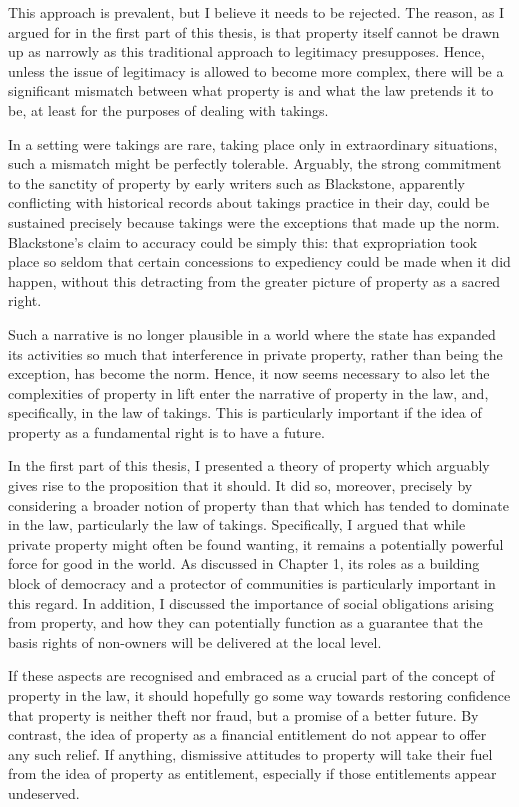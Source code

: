 This approach is prevalent, but I believe it needs to be rejected. The reason, as I argued for in the first part of this thesis, is that property itself cannot be drawn up as narrowly as this traditional approach to legitimacy presupposes. Hence, unless the issue of legitimacy is allowed to become more complex, there will be a significant mismatch between what property is and what the law pretends it to be, at least for the purposes of dealing with takings.

In a setting were takings are rare, taking place only in extraordinary situations, such a mismatch might be perfectly tolerable. Arguably, the strong commitment to the sanctity of property by early writers such as Blackstone, apparently conflicting with historical records about takings practice in their day, could be sustained precisely because takings were the exceptions that made up the norm.  Blackstone's claim to accuracy could be simply this: that expropriation took place so seldom that  certain concessions to expediency could be made when it did happen, without this detracting from the greater picture of property as a sacred right.

Such a narrative is no longer plausible in a world where the state has expanded its activities so much that interference in private property, rather than being the exception, has become the norm. Hence, it now seems necessary to also let the complexities of property in lift enter the narrative of property in the law, and, specifically, in the law of takings. This is particularly important if the idea of property as a fundamental right is to have a future.

In the first part of this thesis, I presented a theory of property which arguably gives rise to the proposition that it should. It did so, moreover, precisely by considering a broader notion of property than that which has tended to dominate in the law, particularly the law of takings. Specifically, I argued that while private property might often be found wanting, it remains a potentially powerful force for good in the world. As discussed in Chapter 1, its roles as a building block of democracy and a protector of communities is particularly important in this regard. In addition, I discussed the importance of social obligations arising from property, and how they can potentially function as a guarantee that the basis rights of non-owners will be delivered at the local level.

If these aspects are recognised and embraced as a crucial part of the concept of property in the law, it should hopefully go some way towards restoring confidence that property is neither theft nor fraud, but a promise of a better future. By contrast, the idea of property as a financial entitlement do not appear to offer any such relief. If anything, dismissive attitudes to property will take their fuel from the idea of property as entitlement, especially if those entitlements appear undeserved. %

